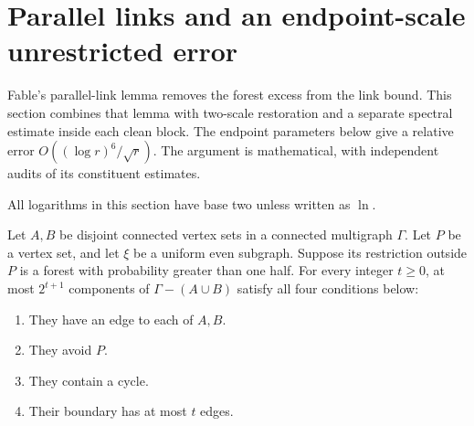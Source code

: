 \section{Parallel links and an endpoint-scale unrestricted error}
\label{sec:parallel-links-endpoint}

Fable's parallel-link lemma removes the forest excess from the link bound.
This section combines that lemma with two-scale restoration and a separate spectral estimate inside each clean block.
The endpoint parameters below give a relative error $O((\log r)^6/\sqrt r)$.
The argument is mathematical, with independent audits of its constituent estimates.

All logarithms in this section have base two unless written as $\ln$.

\begin{lemma}
\label{lem:endpoint-parallel-links}
Let $A,B$ be disjoint connected vertex sets in a connected multigraph $\Gamma$.
Let $P$ be a vertex set, and let $\xi$ be a uniform even subgraph.
Suppose its restriction outside $P$ is a forest with probability greater than one half.
For every integer $t\ge0$, at most $2^{t+1}$ components of $\Gamma-(A\cup B)$ satisfy all four conditions below:
\begin{enumerate}
\item They have an edge to each of $A,B$.
\item They avoid $P$.
\item They contain a cycle.
\item Their boundary has at most $t$ edges.
\end{enumerate}
\end{lemma}

